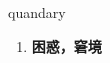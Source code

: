 
\begin{frame}
{\huge quandary}
\begin{center}
\begin{enumerate}\Large
  \item \textbf{困惑，窘境}
\end{enumerate}
\end{center}
\end{frame}

